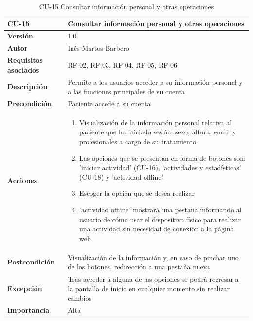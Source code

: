 \begin{table}[p]
	\centering
	\begin{tabularx}{\linewidth}{ p{} p{} }
		\toprule
		\textbf{CU-15}    & \textbf{Consultar información personal y otras operaciones}\\
		\toprule
		\textbf{Versión}              & 1.0    \\
		\textbf{Autor}                & Inés Martos Barbero \\
		\textbf{Requisitos asociados} & RF-02, RF-03, RF-04, RF-05, RF-06 \\
		\textbf{Descripción}          & Permite a los usuarios acceder a su información personal y a las funciones principales de su cuenta \\
		\textbf{Precondición}         & Paciente accede a su cuenta \\
		\textbf{Acciones}             &
		\begin{enumerate}
			\def\labelenumi{\arabic{enumi}.}
			\tightlist
			\item Visualización de la información personal relativa al paciente que ha iniciado sesión: sexo, altura, email y profesionales a cargo de su tratamiento
			\item Las opciones que se presentan en forma de botones son: 'iniciar actividad' (CU-16), 'actividades y estadísticas' (CU-18) y 'actividad offline'.
            \item Escoger la opción que se desea realizar
            \item 'actividad offline' mostrará una pestaña informando al usuario de cómo usar el dispositivo físico para realizar una actividad sin necesidad de conexión a la página web
		\end{enumerate}\\
		\textbf{Postcondición}        & Visualización de la información y, en caso de pinchar uno de los botones, redirección a una pestaña nueva \\
		\textbf{Excepción}          & Tras acceder a alguna de las opciones se podrá regresar a la pantalla de inicio en cualquier momento sin realizar cambios \\
		\textbf{Importancia}          & Alta \\
		\bottomrule
	\end{tabularx}
	\caption{CU-15 Consultar información personal y otras operaciones}
    \label{CU-15}
\end{table}

